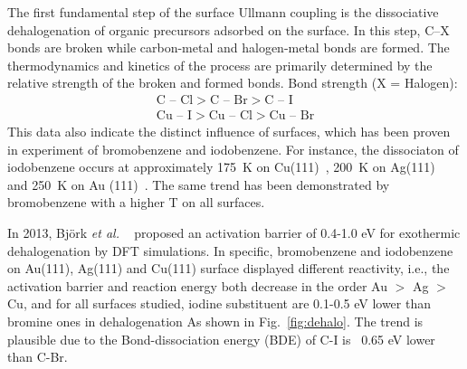 \documentclass[%
 reprint,
 amsmath,amssymb,
 aps,
prb,
]{revtex4-2}
\begin{document}
The first fundamental step of the surface Ullmann coupling is the dissociative dehalogenation of organic precursors adsorbed on the surface. In this step, C--X bonds are broken while carbon-metal and halogen-metal bonds are formed. The thermodynamics and kinetics of the process are primarily determined by the relative strength of the broken and formed bonds. 
Bond strength (X = Halogen): 
%
\begin{eqnarray}
\text{C -- Cl} > \text{C -- Br} > \text{C -- I} \\ 
\text{Cu -- I} > \text{Cu -- Cl} > \text{Cu -- Br}
\end{eqnarray}
%
This data also indicate the distinct influence of surfaces, which has been proven in experiment of bromobenzene and iodobenzene. For instance, the dissociaton of iodobenzene occurs at approximately 175~K on Cu(111)~\cite{sur_sci01}, 200~K on Ag(111)~\cite{sur_sci02} and 250~K on Au (111)~\cite{sur_sci03}. The same trend has been demonstrated by bromobenzene with a higher T on all surfaces.

In 2013, Björk \textit{et al.} ~\cite{jacs2013} proposed an activation barrier of 0.4-1.0 eV for exothermic dehalogenation by DFT simulations. In specific, bromobenzene and iodobenzene on Au(111), Ag(111) and Cu(111) surface displayed different reactivity, i.e., the activation barrier and reaction energy both decrease in the order Au $>$ Ag $>$ Cu, and for all surfaces studied, iodine substituent are 0.1-0.5 eV lower than bromine ones in dehalogenation As shown in Fig.~\ref{fig:dehalo}. The trend is plausible due to the Bond-dissociation energy (BDE) of C-I is ~0.65 eV lower than C-Br\cite{Arpc1982}.
\end{document}
